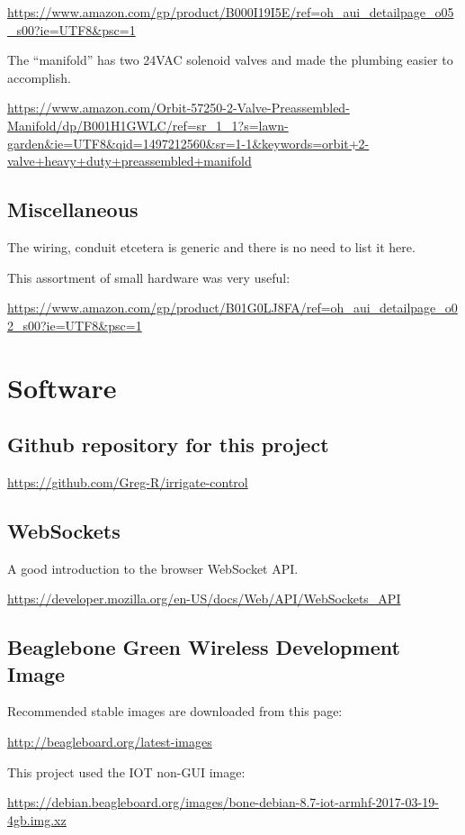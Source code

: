 \url{https://www.amazon.com/gp/product/B000I19I5E/ref=oh_aui_detailpage_o05_s00?ie=UTF8&psc=1}

The ``manifold'' has two 24VAC solenoid valves and made the plumbing easier to 
accomplish.

\url{https://www.amazon.com/Orbit-57250-2-Valve-Preassembled-Manifold/dp/B001H1GWLC/ref=sr_1_1?s=lawn-garden&ie=UTF8&qid=1497212560&sr=1-1&keywords=orbit+2-valve+heavy+duty+preassembled+manifold}

\subsection{Miscellaneous}

The wiring, conduit etcetera is generic and there is no need to list it here.

This assortment of small hardware was very useful:

\url{https://www.amazon.com/gp/product/B01G0LJ8FA/ref=oh_aui_detailpage_o02_s00?ie=UTF8&psc=1}

\section{Software}

\subsection{Github repository for this project}

\url{https://github.com/Greg-R/irrigate-control}

\subsection{WebSockets}

A good introduction to the browser WebSocket API.

\url{https://developer.mozilla.org/en-US/docs/Web/API/WebSockets_API}

\subsection{Beaglebone Green Wireless Development Image}

Recommended stable images are downloaded from this page:

\url{http://beagleboard.org/latest-images}

This project used the IOT non-GUI image:

\url{https://debian.beagleboard.org/images/bone-debian-8.7-iot-armhf-2017-03-19-4gb.img.xz}

